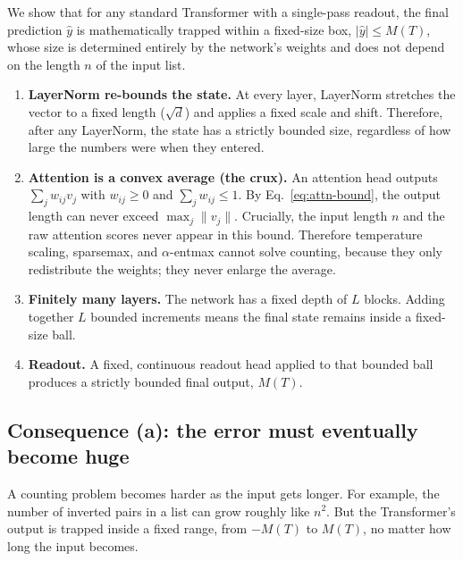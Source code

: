 \documentclass[10pt]{article}
\makeatletter
\theoremstyle{definition}
\renewenvironment{proof}[1][\proofname]{\par\pushQED{\qed}\normalfont
  \topsep6\p@\@plus6\p@\relax\trivlist
  \item[\hskip\labelsep\bfseries #1\@addpunct{.}]\ignorespaces}
  {\popQED\endtrivlist\@endpefalse}
\makeatother
\begin{document}
\begin{proof}[Proof of Lemma~\ref{lem:bounded}]
We show that for any standard Transformer with a single-pass readout, the
final prediction $\hat y$ is mathematically trapped within a fixed-size
box, $|\hat y| \leq M(T)$, whose size is determined entirely by the
network's weights and does not depend on the length $n$ of the input list.

\begin{enumerate}
\item \textbf{LayerNorm re-bounds the state.} At every layer, LayerNorm
  stretches the vector to a fixed length ($\sqrt{d}$) and applies a fixed
  scale and shift. Therefore, after any LayerNorm, the state has a
  strictly bounded size, regardless of how large the numbers were when
  they entered.

\item \textbf{Attention is a convex average (the crux).} An attention head
  outputs $\sum_j w_{ij} v_j$ with $w_{ij} \geq 0$ and
  $\sum_j w_{ij} \leq 1$. By Eq.~\eqref{eq:attn-bound}, the output length
  can never exceed $\max_j \|v_j\|$. Crucially, the input length $n$ and
  the raw attention scores never appear in this bound. Therefore
  temperature scaling, sparsemax, and $\alpha$-entmax cannot solve
  counting, because they only redistribute the weights; they never enlarge
  the average.

\item \textbf{Finitely many layers.} The network has a fixed depth of $L$
  blocks. Adding together $L$ bounded increments means the final state
  remains inside a fixed-size ball.

\item \textbf{Readout.} A fixed, continuous readout head applied to that
  bounded ball produces a strictly bounded final output, $M(T)$.
  \qedhere
\end{enumerate}
\end{proof}

\subsection{Consequence (a): the error must eventually become huge}
\label{sec:conseq-a}

A counting problem becomes harder as the input gets longer. For example,
the number of inverted pairs in a list can grow roughly like $n^2$. But
the Transformer's output is trapped inside a fixed range, from $-M(T)$ to
$M(T)$, no matter how long the input becomes.
\end{document}
